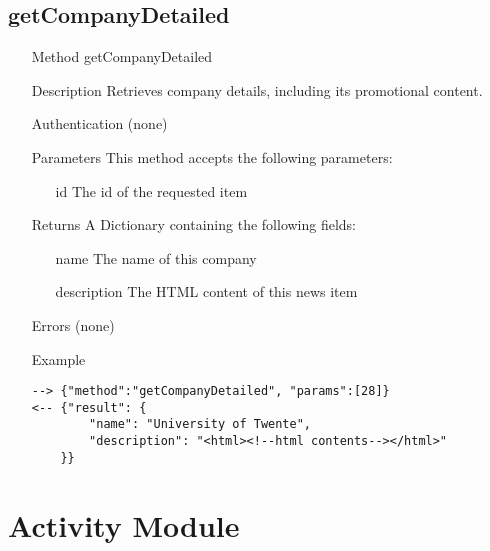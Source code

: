 \documentclass[a4paper]{scrreprt}
\begin{document}
\subsection{getCompanyDetailed}
\begin{enumerate}
\item[Method] getCompanyDetailed
\item[Description] Retrieves company details, including its promotional content.
\item[Authentication] (none)
\item[Parameters] This method accepts the following parameters:
\begin{enumerate}
    \item[id] The id of the requested item
    \end{enumerate}
\item[Returns] A Dictionary containing the following fields:
\begin{enumerate}
    \item[name] The name of this company
    \item[description] The HTML content of this news item
	\end{enumerate}
\item[Errors] (none)
\item[Example]
\begin{lstlisting}
--> {"method":"getCompanyDetailed", "params":[28]}
<-- {"result": {
        "name": "University of Twente",
        "description": "<html><!--html contents--></html>"
    }}
\end{lstlisting}
\end{enumerate}


\clearpage
\section{Activity Module}
\end{document}
